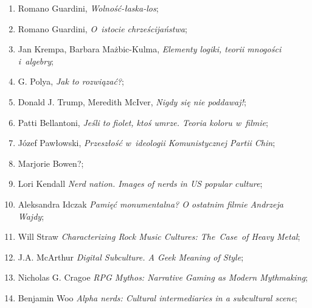 \documentclass[a4paper,11pt]{article}
\begin{document}
\begin{enumerate}
\item Romano Guardini, \textit{Wolność-łaska-los};



\item Romano Guardini, \textit{O~istocie chrześcijaństwa};



\item Jan Krempa, Barbara Mażbic-Kulma, \textit{Elementy logiki, teorii
    mnogości i~algebry};



\item G. Polya, \textit{Jak to rozwiązać?};



\item Donald J. Trump, Meredith McIver, \textit{Nigdy się nie poddawaj!};



\item Patti Bellantoni, \textit{Jeśli to fiolet, ktoś umrze. Teoria koloru
    w~filmie};



\item Józef Pawłowski, \textit{Przeszłość w~ideologii Komunistycznej Partii
    Chin};



\item Marjorie Bowen?;



\item Lori Kendall \textit{Nerd nation. Images of nerds in US popular
    culture};



\item Aleksandra Idczak \textit{Pamięć monumentalna? O ostatnim filmie
    Andrzeja Wajdy};



\item Will Straw \textit{Characterizing Rock Music Cultures: The~Case~of
  Heavy Metal};



\item J.A. McArthur \textit{Digital Subculture. A Geek Meaning of Style};



\item Nicholas G. Cragoe \textit{RPG Mythos: Narrative Gaming as
    Modern Mythmaking};



\item Benjamin Woo \textit{Alpha nerds: Cultural intermediaries in a
    subcultural scene};




\end{enumerate}
\end{document}
